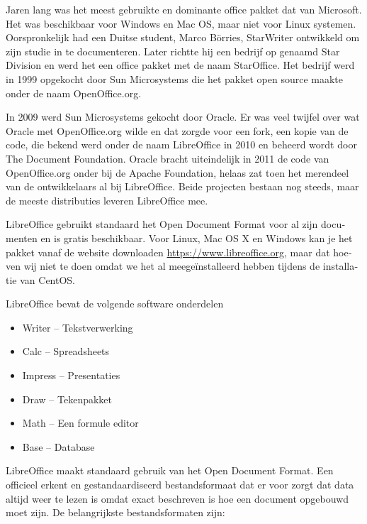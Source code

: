 Jaren lang was het meest gebruikte en dominante office pakket dat van Microsoft. Het was
beschikbaar voor Windows en Mac OS, maar niet voor Linux systemen. Oorspronkelijk had een Duitse student, Marco
B\"orries, StarWriter ontwikkeld om zijn studie in te documenteren. Later richtte hij een bedrijf op genaamd Star
Division en werd het een office pakket met de naam StarOffice. Het bedrijf werd in 1999 opgekocht door Sun Microsystems
die het pakket open source maakte onder de naam OpenOffice.org.

{
\foreignlanguage{dutch}{In 2009 werd Sun Microsystems gekocht door Oracle. Er was veel twijfel over wat Oracle met
OpenOffice.org wilde en dat zorgde voor een fork, een kopie van de code, die bekend werd onder de naam LibreOffice in
2010 en beheerd wordt door The Document Foundation. Oracle bracht }\foreignlanguage{dutch}{uiteindelijk in 2011 de code
van OpenOffice.org onder bij de Apache Foundation, helaas zat toen het merendeel van de ontwikkelaars al bij
LibreOffice. Beide projecten bestaan nog steeds, maar de meeste distributies leveren LibreOffice mee.}}

{
\foreignlanguage{dutch}{LibreOffice gebruikt standaard het Open Document Format voor al zijn documenten en is gratis
beschikbaar. Voor Linux, Mac OS X en Windows kan je het pakket vanaf de website downloaden
}\href{https://www.libreoffice.org/}{https://www.libreoffice.org}\foreignlanguage{dutch}{, maar dat hoeven wij niet te
doen omdat we het al meege\"installeerd hebben tijdens de installatie van CentOS.}}

{
LibreOffice bevat de volgende software onderdelen}

\begin{itemize}
\item {
Writer -- Tekstverwerking}
\item {
Calc -- Spreadsheets}
\item {
Impress -- Presentaties}
\item {
Draw -- Tekenpakket}
\item {
Math -- Een formule editor}
\item {
Base -- Database}
\end{itemize}
{
LibreOffice maakt standaard gebruik van het Open Document Format. Een officieel erkent en gestandaardiseerd
bestandsformaat dat er voor zorgt dat data altijd weer te lezen is omdat exact beschreven is hoe een document opgebouwd
moet zijn. De belangrijkste bestandsformaten zijn:}

